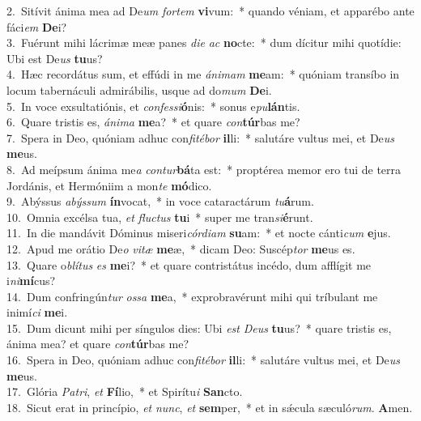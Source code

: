 {2.~}Sitívit ánima mea ad De\textit{um} \textit{for}\textit{tem} \textbf{vi}vum:~* quando véniam, et apparébo ante fáci\textit{em} \textbf{De}i?\\
{3.~}Fuérunt mihi lácrimæ meæ panes \textit{di}\textit{e} \textit{ac} \textbf{no}cte:~* dum dícitur mihi quotídie: Ubi est De\textit{us} \textbf{tu}us?\\
{4.~}Hæc recordátus sum, et effúdi in me \textit{á}\textit{ni}\textit{mam} \textbf{me}am:~* quóniam transíbo in locum tabernáculi admirábilis, usque ad do\textit{mum} \textbf{De}i.\\
{5.~}In voce exsultatiónis, et \textit{con}\textit{fes}\textit{si}\textbf{ó}nis:~* sonus e\textit{pu}\textbf{lán}tis.\\
{6.~}Quare tristis es, \textit{á}\textit{ni}\textit{ma} \textbf{me}a?~* et quare \textit{con}\textbf{túr}bas me?\\
{7.~}Spera in Deo, quóniam adhuc con\textit{fi}\textit{té}\textit{bor} \textbf{il}li:~* salutáre vultus mei, et De\textit{us} \textbf{me}us.\\
{8.~}Ad meípsum ánima me\textit{a} \textit{con}\textit{tur}\textbf{bá}ta est:~* proptérea memor ero tui de terra Jordánis, et Hermóniim a mon\textit{te} \textbf{mó}dico.\\
{9.~}Abýssus \textit{a}\textit{býs}\textit{sum} \textbf{ín}vocat,~* in voce cataractárum \textit{tu}\textbf{á}rum.\\
{10.~}Omnia excélsa tua, \textit{et} \textit{flu}\textit{ctus} \textbf{tu}i~* super me tran\textit{si}\textbf{é}runt.\\
{11.~}In die mandávit Dóminus miseri\textit{cór}\textit{di}\textit{am} \textbf{su}am:~* et nocte cánti\textit{cum} \textbf{e}jus.\\
{12.~}Apud me orátio De\textit{o} \textit{vi}\textit{tæ} \textbf{me}æ,~* dicam Deo: Suscép\textit{tor} \textbf{me}us es.\\
{13.~}Quare o\textit{blí}\textit{tus} \textit{es} \textbf{me}i?~* et quare contristátus incédo, dum afflígit me i\textit{ni}\textbf{mí}cus?\\
{14.~}Dum confringún\textit{tur} \textit{os}\textit{sa} \textbf{me}a,~* exprobravérunt mihi qui tríbulant me inimí\textit{ci} \textbf{me}i.\\
{15.~}Dum dicunt mihi per síngulos dies: Ubi \textit{est} \textit{De}\textit{us} \textbf{tu}us?~* quare tristis es, ánima mea? et quare \textit{con}\textbf{túr}bas me?\\
{16.~}Spera in Deo, quóniam adhuc con\textit{fi}\textit{té}\textit{bor} \textbf{il}li:~* salutáre vultus mei, et De\textit{us} \textbf{me}us.\\
{17.~}Glória \textit{Pa}\textit{tri}, \textit{et} \textbf{Fí}lio,~* et Spirítu\textit{i} \textbf{San}cto.\\
{18.~}Sicut erat in princípio, \textit{et} \textit{nunc}, \textit{et} \textbf{sem}per,~* et in sǽcula sæculó\textit{rum}. \textbf{A}men.\\
